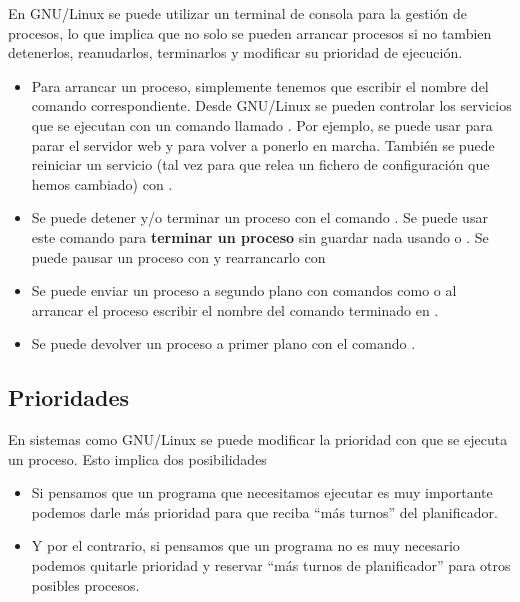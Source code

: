 \documentclass[a4paper,12pt,spanish]{sphinxmanual}
\begin{document}
En GNU/Linux se puede utilizar un terminal de consola para la gestión de procesos, lo que implica que no solo se pueden arrancar procesos si no tambien detenerlos, reanudarlos, terminarlos y modificar su prioridad de ejecución.
\begin{itemize}
\item {} 
Para arrancar un proceso, simplemente tenemos que escribir el nombre del comando correspondiente. Desde GNU/Linux se pueden controlar los servicios que se ejecutan con un comando llamado . Por ejemplo, se puede usar  para parar el servidor web y  para volver a ponerlo en marcha. También se puede reiniciar un servicio (tal vez para que relea un fichero de configuración que hemos cambiado) con .

\item {} 
Se puede detener y/o terminar un proceso con el comando . Se puede usar este comando para \textbf{terminar un proceso} sin guardar nada usando  o . Se puede pausar un proceso con  y rearrancarlo con 

\item {} 
Se puede enviar un proceso a segundo plano con comandos como  o al arrancar el proceso escribir el nombre del comando terminado en \sphinxcode{\&}.

\item {} 
Se puede devolver un proceso a primer plano con el comando .

\end{itemize}


\subsection{Prioridades}
\label{textos/tema1:prioridades}
En sistemas como GNU/Linux se puede modificar la prioridad con que se ejecuta un proceso. Esto implica dos posibilidades
\begin{itemize}
\item {} 
Si pensamos que un programa que necesitamos ejecutar es muy importante podemos darle más prioridad para que reciba ``más turnos'' del planificador.

\item {} 
Y por el contrario, si pensamos que un programa no es muy necesario podemos quitarle prioridad y reservar ``más turnos de planificador'' para otros posibles procesos.

\end{itemize}
\end{document}
